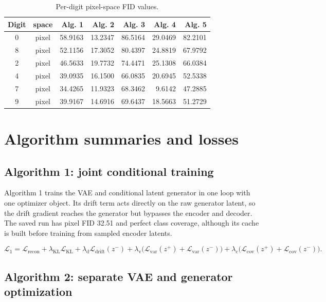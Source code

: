 \documentclass[10pt]{article}
\begin{document}
\begin{table}[htbp]
\centering
\scriptsize
\caption{Per-digit pixel-space FID values.}
\begin{tabular}{c crrrrr}
\hline
Digit & space & Alg. 1 & Alg. 2 & Alg. 3 & Alg. 4 & Alg. 5 \\
\hline
0 & pixel & 58.9163 & 13.2347 & 86.5164 & 29.0469 & 82.2101 \\
8 & pixel & 52.1156 & 17.3052 & 80.4397 & 24.8819 & 67.9792 \\
2 & pixel & 46.5633 & 19.7732 & 74.4471 & 25.1308 & 66.0384 \\
4 & pixel & 39.0935 & 16.1500 & 66.0835 & 20.6945 & 52.5338 \\
7 & pixel & 34.4265 & 11.9323 & 68.3462 & 9.6142 & 47.2885 \\
9 & pixel & 39.9167 & 14.6916 & 69.6437 & 18.5663 & 51.2729 \\
\hline
\end{tabular}
\end{table}

\section*{Algorithm summaries and losses}

\subsection*{Algorithm 1: joint conditional training}

Algorithm 1 trains the VAE and conditional latent generator in one loop with
one optimizer object.  Its drift term acts directly on the raw generator
latent, so the drift gradient reaches the generator but bypasses the encoder
and decoder.  The saved run has pixel FID 32.51 and perfect class coverage,
although its cache is built before training from sampled encoder latents.

\[
\mathcal L_1=\mathcal L_{\mathrm{recon}}
 +\lambda_{\mathrm{KL}}\mathcal L_{\mathrm{KL}}
 +\lambda_{\mathrm d}\mathcal L_{\mathrm{drift}}(z^-)
 +\lambda_{\mathrm v}\bigl(\mathcal L_{\mathrm{var}}(z^+)+\mathcal L_{\mathrm{var}}(z^-)\bigr)
 +\lambda_{\mathrm c}\bigl(\mathcal L_{\mathrm{cov}}(z^+)+\mathcal L_{\mathrm{cov}}(z^-)\bigr).
\]

\subsection*{Algorithm 2: separate VAE and generator optimization}
\end{document}
